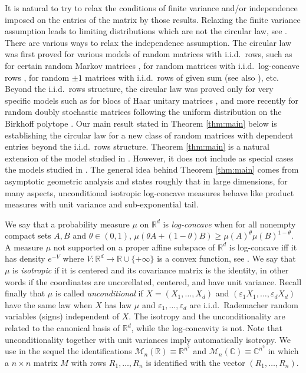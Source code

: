\documentclass[12pt,reqno]{amsart}
\begin{document}
It is natural to try to relax the conditions of finite variance and/or
independence imposed on the entries of the matrix by those results. Relaxing
the finite variance assumption leads to limiting distributions which are not
the circular law, see \cite{BCC2,BCAround}. There are various ways to relax
the independence assumption. The circular law was first proved for various
models of random matrices with i.i.d.\ rows, such as for certain random Markov
matrices \cite{BCC1}, for random matrices with i.i.d.\ log-concave rows
\cite{CircLawUnc,InfoNoise}, for random $\pm1$ matrices with i.i.d.\ rows of
given sum \cite{NguyenVuCirc} (see also \cite{MR3010398}), etc. Beyond the
i.i.d.\ rows structure, the circular law was proved only for very specific
models such as for blocs of Haar unitary matrices \cite{MR2480790,MR2919538},
and more recently for random doubly stochastic matrices following the uniform
distribution on the Birkhoff polytope \cite{NguyenDoublyStoch}. Our main
result stated in Theorem \ref{thm:main} below is establishing the circular law
for a new class of random matrices with dependent entries beyond the i.i.d.\
rows structure. Theorem \ref{thm:main} is a natural extension of the model
studied in \cite{CircLawUnc}. However, it does not include as special cases
the models studied in \cite{MR2480790,MR2919538,NguyenDoublyStoch}. The
general idea behind Theorem \ref{thm:main} comes from asymptotic geometric
analysis and states roughly that in large dimensions, for many aspects,
unconditional isotropic log-concave measures behave like product measures with
unit variance and sub-exponential tail.

We say that a probability measure $\mu$ on ${\mathbb{R}}^d$ is \emph{log-concave} when
for all nonempty compact sets $A,B$ and $\theta \in (0,1)$, $\mu(\theta A +
(1-\theta)B) \ge \mu(A)^\theta\mu(B)^{1-\theta}$. A measure $\mu$ not
supported on a proper affine subspace of ${\mathbb{R}}^d$ is log-concave iff it has
density $e^{-V}$ where $V \colon {\mathbb{R}}^d \to {\mathbb{R}}\cup\{+\infty\}$ is a convex
function, see \cite{B}. We say that $\mu$ is \emph{isotropic} if it is
centered and its covariance matrix is the identity, in other words if the
coordinates are uncorellated, centered, and have unit variance. Recall finally
that $\mu$ is called \emph{unconditional} if $X=(X_1,\ldots,X_d)$ and
$(\varepsilon_1 X_1,\ldots,\varepsilon_d X_d)$ have the same law when $X$ has
law $\mu$ and $\varepsilon_1,\ldots,\varepsilon_d$ are i.i.d.\ Rademacher
random variables (signs) independent of $X$. The isotropy and the
unconditionality are related to the canonical basis of ${\mathbb{R}}^d$, while the
log-concavity is not. Note that unconditionality together with unit variances
imply automatically isotropy. We use in the sequel the identifications
$\mathcal{M}_n({\mathbb{R}})\equiv{\mathbb{R}}^{n^2}$ and $\mathcal{M}_n({\mathbb{C}})\equiv{\mathbb{C}}^{n^2}$ in
which a $n\times n$ matrix $M$ with rows $R_1,\ldots,R_n$ is identified with
the vector $(R_1,\ldots,R_n)$.
\end{document}
